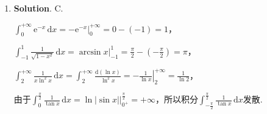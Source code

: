 \documentclass[../Main.tex]{subfiles}
\begin{document}
\begin{enumerate}
          方程$\mathrm{d}f(x)=-\mathrm{e}^{\cos x}\sin x\,\mathrm{d}x$两边从$0$积分到$t$，得
          \[
              \begin{aligned}
                  \int_{0}^{t}\,\mathrm{d}f(x) = & -\int_{0}^{t}\mathrm{e}^{\cos x}\sin x\,\mathrm{d}x               \\
                  f(t)-f(0) =                    & \int_{0}^{t}\mathrm{e}^{\cos x}\,\mathrm{d}(\cos x)               \\
                  f(t)=                          & \mathrm{e}^{\cos x}\bigg|_{0}^{t}=\mathrm{e}^{\cos t}-\mathrm{e}.
              \end{aligned}
          \]

          故$f(x)=\mathrm{e}^{\cos x}-\mathrm{e}$.

    \item \textbf{Solution}. C.

          $\int_{0}^{+\infty}\mathrm{e}^{-x}\,\mathrm{d}x=-\mathrm{e}^{-x}\bigg|_{0}^{+\infty}
              =0-(-1)=1$，

          $\int_{-1}^{1}\frac{1}{\sqrt{1-x^{2}}}\,\mathrm{d}x=\arcsin x\bigg|_{-1}^{1}=
              \frac{\pi}{2}-\left(-\frac{\pi}{2}\right)=\pi$，

          $\int_{2}^{+\infty}\frac{1}{x\ln^{2} x}\,\mathrm{d}x=\int_{2}^{+\infty}\frac{\mathrm{d}(\ln
                  x)}{\ln^{2} x}=\left.-\frac{1}{\ln x}\right|_{2}^{+\infty}=\frac{1}{\ln 2}$，

          由于$\int_{0}^{\frac{\pi}{2}}\frac{1}{\tan x}\,\mathrm{d}x=\ln|\sin x|\bigg|_{0^+}
              ^{\frac{\pi}{2}}=+\infty$，所以积分$\int_{-\frac{\pi}{2}}^{\frac{\pi}{2}}\frac{1}{\tan
                  x}\,\mathrm{d}x$发散.
\end{enumerate}
\end{document}
